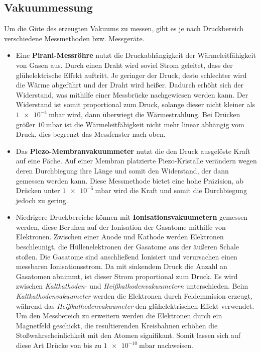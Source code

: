 \subsection{Vakuummessung}
Um die Güte des erzeugten Vakuums zu messen, gibt es je nach Druckbereich verschiedene Messmethoden bzw. Messgeräte.
\begin{itemize}
    \item Eine \textbf{Pirani-Messröhre} nutzt die Druckabhängigkeit der Wärmeleitfähigkeit von Gasen aus. Durch einen Draht wird
    soviel Strom geleitet, dass der glühelektrische Effekt auftritt. Je geringer der Druck, desto schlechter wird die Wärme abgeführt und der
    Draht wird heißer. Dadurch erhöht sich der Widerstand, was mithilfe einer Messbrücke nachgewiesen werden kann. Der Widerstand ist somit
    proportional zum Druck, solange dieser nicht kleiner als $\qty{1e-4}{\milli\bar}$ \cite{Druckmessung} wird, dann überwiegt die Wärmestrahlung.
    Bei Drücken größer $\qty{10}{\milli\bar}$ ist die Wärmeleitfähigkeit nicht mehr linear abhängig vom Druck, dies begrenzt das Messfenster nach oben.
    \item Das \textbf{Piezo-Membranvakuummeter} nutzt die den Druck ausgelöste Kraft auf eine Fäche. Auf einer Membran platzierte Piezo-Kristalle
    verändern wegen deren Durchbiegung ihre Länge und somit den Widerstand, der dann gemessen werden kann. Diese Messmethode bietet eine hohe Präzision,
    ab Drücken unter $\qty{1e-5}{\milli\bar}$ \cite{Druckmessung} wird die Kraft und somit die Durchbiegung jedoch zu gering.
    \item Niedrigere Druckbereiche können mit \textbf{Ionisationsvakuumetern} gemessen werden, diese Beruhen auf der Ionisation der Gasatome mithilfe von
    Elektronen. Zwischen einer Anode und Kathode werden Elektronen beschleunigt, die Hüllenelektronen der Gasatome aus der äußeren Schale stoßen.
    Die Gasatome sind anschließend Ionisiert und verursachen einen messbaren Ionisationsstrom. Da mit sinkendem Druck die Anzahl an Gasatomen abnimmt,
    ist dieser Strom proportional zum Druck. Es wird zwischen \textit{Kaltkathoden-} und \textit{Heißkathodenvakuumetern} unterschieden.
    Beim \textit{Kaltkathodenvakuumeter} werden die Elektronen durch Feldemmision erzeugt, während das \textit{Heißkathodenvakuumeter} den
    glühelektrischen Effekt verwendet. Um den Messbereich zu erweitern werden die Elektronen durch ein Magnetfeld geschickt, die resultierenden
    Kreisbahnen erhöhen die Stoßwahrscheinlichkeit mit den Atomen signifikant. Somit lassen sich auf diese Art Drücke von bis zu $\qty{1e-10}{\milli\bar}$
    nachweisen. \cite{Druckmessung}
\end{itemize}